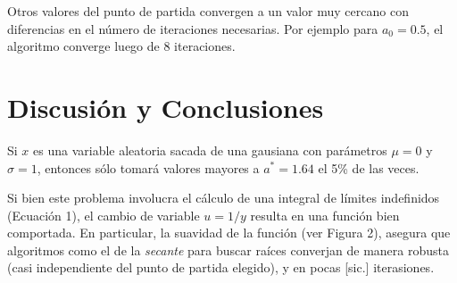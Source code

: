 \documentclass[letter, 11pt]{article}
\begin{document}
Otros valores del punto de partida convergen a un valor muy cercano con
diferencias en el número de iteraciones necesarias. Por ejemplo para $a_0=0.5$,
el algoritmo converge luego de 8 iteraciones.

\section{Discusión y Conclusiones}

Si $x$ es una variable aleatoria sacada de una gausiana con parámetros $\mu=0$
y $\sigma=1$, entonces sólo tomará valores mayores a $a^*=1.64$ el 5\% de las
veces.

Si bien este problema involucra el cálculo de una integral de límites
indefinidos (Ecuación 1), el cambio de variable $u = 1/y$ resulta en una
función bien comportada. En particular, la suavidad de la función (ver Figura
2), asegura que algoritmos como el de la {\it secante} para buscar raíces
converjan de manera robusta (casi independiente del punto de partida elegido),
y en pocas [sic.] iterasiones.
\end{document}
